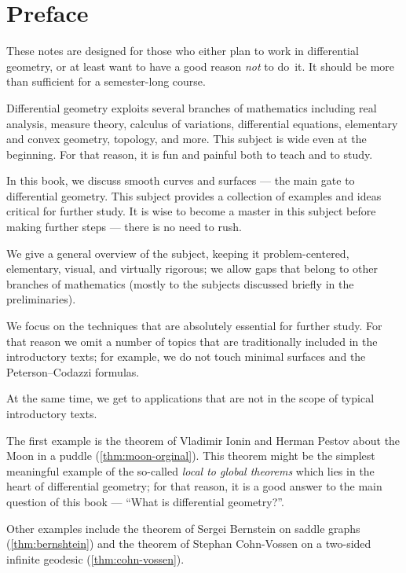 \vfill

\newpage
\chapter*{Preface}
\thispagestyle{myheadings}

These notes are designed for those who either plan to work in differential geometry,
or at least want to have a good reason \textit{not} to do~it.
It should be more than sufficient for a semester-long course. 

Differential geometry exploits several branches of mathematics including 
real analysis, 
measure theory,
calculus of variations,
differential equations,
elementary and convex geometry,
topology, and more.
This subject is wide even at the beginning. 
For that reason, it is fun and painful both to teach and to study.

In this book, we discuss smooth curves and surfaces --- the main gate to differential geometry.
This subject provides a collection of examples and ideas critical for further study.
It is wise to become a master in this subject before making further steps --- there is no need to rush.

We give a general overview of the subject, keeping it
problem-centered,
elementary, 
visual, 
and virtually rigorous; we allow gaps that belong to other branches of mathematics (mostly to the subjects discussed briefly in the preliminaries).

We focus on the techniques that are absolutely essential for further study.
For  that reason we omit a number of topics that are traditionally included in the introductory texts;
for example, we do not touch 
minimal surfaces
and the Peterson--Codazzi formulas.

At the same time, we get to applications that are not in the scope of typical introductory texts.
 
The first example is the theorem of Vladimir Ionin and Herman Pestov about the Moon in a puddle (\ref{thm:moon-orginal}).
This theorem might be the simplest meaningful example of the so-called {}\emph{local to global theorems} which lies in the heart of differential geometry;
for that reason, it is a good answer to the main question of this book --- ``What is differential geometry?''.

Other examples include the theorem of Sergei Bernstein on saddle graphs (\ref{thm:bernshtein}) and the theorem of Stephan Cohn-Vossen
on a two-sided infinite geodesic (\ref{thm:cohn-vossen}).

